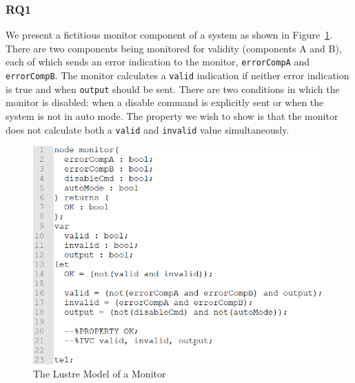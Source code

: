 \subsubsection{RQ1}
We present a fictitious monitor component of a system as shown in Figure~\ref{fig:monitorLustre}. There are two components being monitored for validity (components A and B), each of which sends an error indication to the monitor, \texttt{errorCompA} and \texttt{errorCompB}. The monitor calculates  a \texttt{valid} indication if neither error indication is true and when \texttt{output} should be sent. There are two conditions in which the monitor is disabled: when a disable command is explicitly sent or when the system is not in auto mode. The property we wish to show is that the monitor does not calculate both a \texttt{valid} and \texttt{invalid} value simultaneously. 
\begin{figure}[h!]
\begin{center}
\includegraphics[width=.8\textwidth]{images/monitorLustre.PNG}
\caption{The Lustre Model of a Monitor} 
\label{fig:monitorLustre}
\end{center}
\end{figure} 


